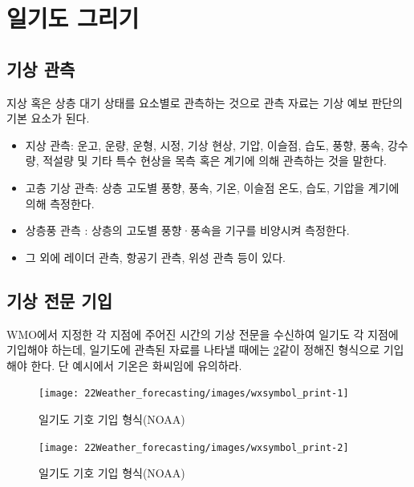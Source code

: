 \newpage
\section{일기도 그리기}

\subsection{기상 관측}
지상 혹은 상층 대기 상태를 요소별로 관측하는 것으로 관측 자료는 기상 예보 판단의 기본 요소가 된다.

\begin{itemize}
	\item 지상 관측: 운고, 운량, 운형, 시정, 기상 현상, 기압, 이슬점, 습도, 풍향, 풍속, 강수량, 적설량 및 기타 특수 현상을 목측 혹은 계기에 의해 관측하는 것을 말한다.
	\item 고층 기상 관측: 상층 고도별 풍향, 풍속, 기온, 이슬점 온도, 습도, 기압을 계기에 의해 측정한다.
	\item 상층풍 관측 : 상층의 고도별 풍향·풍속을 기구를 비양시켜 측정한다.
	\item 그 외에 레이더 관측, 항공기 관측, 위성 관측 등이 있다.
\end{itemize}


\subsection{기상 전문 기입}

WMO에서 지정한 각 지점에 주어진 시간의 기상 전문을 수신하여 일기도 각 지점에 기입해야 하는데, 일기도에 관측된 자료를 나타낼 때에는 \ref{fig:drawsymbols-1}\과 같이 정해진 형식으로 기입해야 한다. 단 예시에서 기온은 화씨임에 유의하라.

\begin{figure}[p]
	\centering
	\texttt{[image: 22Weather\_forecasting/images/wxsymbol\_print-1]}
	\caption{일기도 기호 기입 형식(NOAA)}
	\label{fig:drawsymbols-1}
\end{figure}

\begin{figure}[p]
	\centering
	\texttt{[image: 22Weather\_forecasting/images/wxsymbol\_print-2]}
	\caption{일기도 기호 기입 형식(NOAA)}
	\label{fig:drawsymbols-1}
\end{figure}


